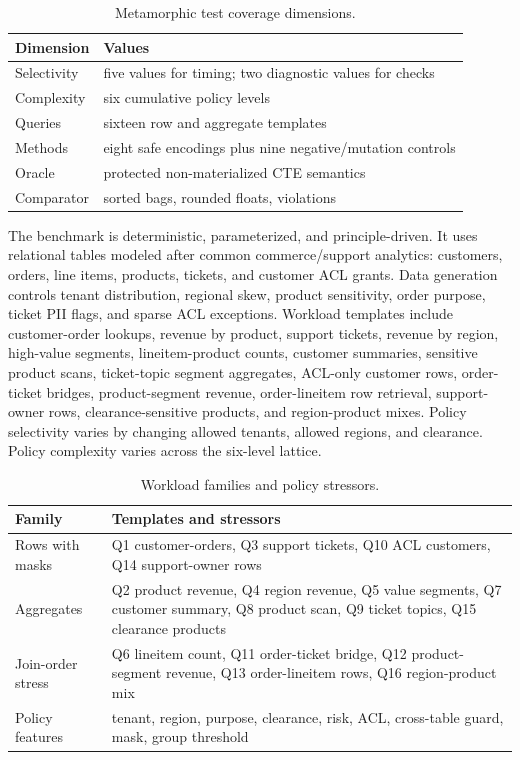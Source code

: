 \documentclass[conference]{IEEEtran}
\begin{document}
\begin{table}[t]
\centering
\caption{Metamorphic test coverage dimensions.}
\label{tab:coverage}
\begin{tabular}{p{}p{}}
\toprule
Dimension & Values \\
\midrule
Selectivity & five values for timing; two diagnostic values for checks \\
Complexity & six cumulative policy levels \\
Queries & sixteen row and aggregate templates \\
Methods & eight safe encodings plus nine negative/mutation controls \\
Oracle & protected non-materialized CTE semantics \\
Comparator & sorted bags, rounded floats, violations \\
\bottomrule
\end{tabular}
\end{table}

The benchmark is deterministic, parameterized, and principle-driven. It uses relational tables modeled after common commerce/support analytics: customers, orders, line items, products, tickets, and customer ACL grants. Data generation controls tenant distribution, regional skew, product sensitivity, order purpose, ticket PII flags, and sparse ACL exceptions. Workload templates include customer-order lookups, revenue by product, support tickets, revenue by region, high-value segments, lineitem-product counts, customer summaries, sensitive product scans, ticket-topic segment aggregates, ACL-only customer rows, order-ticket bridges, product-segment revenue, order-lineitem row retrieval, support-owner rows, clearance-sensitive products, and region-product mixes. Policy selectivity varies by changing allowed tenants, allowed regions, and clearance. Policy complexity varies across the six-level lattice.

\begin{table}[t]
\centering
\caption{Workload families and policy stressors.}
\label{tab:workload}
\begin{tabular}{p{}p{}}
\toprule
Family & Templates and stressors \\
\midrule
Rows with masks & Q1 customer-orders, Q3 support tickets, Q10 ACL customers, Q14 support-owner rows \\
Aggregates & Q2 product revenue, Q4 region revenue, Q5 value segments, Q7 customer summary, Q8 product scan, Q9 ticket topics, Q15 clearance products \\
Join-order stress & Q6 lineitem count, Q11 order-ticket bridge, Q12 product-segment revenue, Q13 order-lineitem rows, Q16 region-product mix \\
Policy features & tenant, region, purpose, clearance, risk, ACL, cross-table guard, mask, group threshold \\
\bottomrule
\end{tabular}
\end{table}
\end{document}

